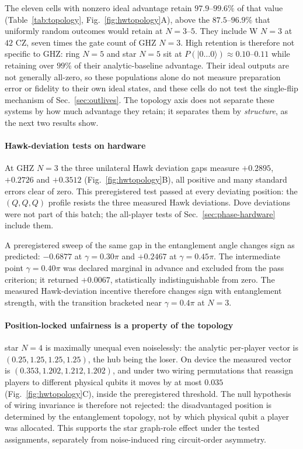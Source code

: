 \documentclass[conference,letterpaper,10pt]{IEEEtran}
\newcommand{\ket}[1]{\ensuremath{|#1\rangle}}
\begin{document}
The eleven cells with nonzero ideal advantage retain $97.9$--$99.6\%$ of that
value (Table~\ref{tab:topology}, Fig.~\ref{fig:hwtopology}A), above the
$87.5$--$96.9\%$ that uniformly random outcomes would retain at $N=3$--$5$.
They include W $N=3$ at $42$ CZ, seven times the gate count of GHZ $N=3$.
High retention is therefore not specific to GHZ: ring $N=5$ and star $N=5$
sit at $P(\ket{0\ldots0})\approx0.10$--$0.11$ while retaining over $99\%$ of
their analytic-baseline advantage. Their ideal outputs are not generally
all-zero, so these populations alone do not measure preparation error or
fidelity to their own ideal states, and these cells do not test the
single-flip mechanism of Sec.~\ref{sec:outlives}. The
topology axis does not separate these systems by how much advantage they retain;
it separates them by \emph{structure}, as the next two results show.

\paragraph{Hawk-deviation tests on hardware}
At GHZ $N=3$ the three unilateral Hawk deviation gaps measure $+0.2895$,
$+0.2726$ and $+0.3512$ (Fig.~\ref{fig:hwtopology}B), all positive and many
standard errors clear of zero. This preregistered test passed at every
deviating position: the $(Q,Q,Q)$ profile resists the three measured Hawk
deviations. Dove deviations were not part of this batch; the all-player tests
of Sec.~\ref{sec:phase-hardware} include them.

A preregistered sweep of the same gap in the entanglement angle changes sign
as predicted: $-0.6877$ at $\gamma=0.30\pi$ and $+0.2467$ at $\gamma=0.45\pi$. The
intermediate point $\gamma=0.40\pi$ was declared marginal in advance and
excluded from the pass criterion; it returned $+0.0067$, statistically
indistinguishable from zero. The measured Hawk-deviation incentive therefore changes sign with entanglement strength, with the
transition bracketed near $\gamma=0.4\pi$ at $N=3$.

\paragraph{Position-locked unfairness is a property of the topology}
star $N=4$ is maximally unequal even noiselessly: the analytic per-player
vector is $(0.25,1.25,1.25,1.25)$, the hub being the loser. On device the
measured vector is $(0.353,1.202,1.212,1.202)$, and under two wiring
permutations that reassign players to different physical qubits it moves by at
most $0.035$ (Fig.~\ref{fig:hwtopology}C), inside the preregistered threshold.
The null hypothesis of wiring invariance is therefore not rejected: the disadvantaged position is
determined by the entanglement topology, not by which physical qubit a player
was allocated. This supports the star graph-role effect under the tested assignments, separately from noise-induced ring circuit-order asymmetry.
\end{document}
